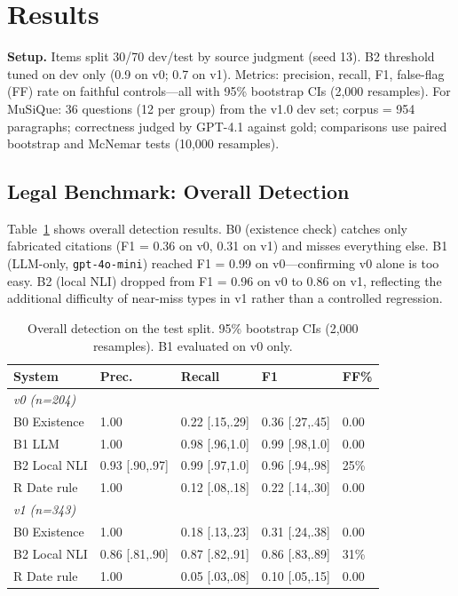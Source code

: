 \documentclass[conference]{IEEEtran}
\begin{document}
\section{Results}
\label{sec:experiments}

\textbf{Setup.} Items split 30/70 dev/test by source judgment (seed 13). B2 threshold tuned on
dev only (0.9 on v0; 0.7 on v1). Metrics: precision, recall, F1, false-flag (FF) rate on
faithful controls---all with 95\% bootstrap CIs (2,000 resamples). For MuSiQue: 36 questions
(12 per group) from the v1.0 dev set; corpus = 954 paragraphs; correctness judged by GPT-4.1
against gold; comparisons use paired bootstrap and McNemar tests (10,000 resamples).

\subsection{Legal Benchmark: Overall Detection}

Table~\ref{tab:overall} shows overall detection results. B0 (existence check) catches only
fabricated citations (F1 = 0.36 on v0, 0.31 on v1) and misses everything else. B1 (LLM-only,
\texttt{gpt-4o-mini}) reached F1 = 0.99 on v0---confirming v0 alone is too easy. B2 (local NLI)
dropped from F1 = 0.96 on v0 to 0.86 on v1, reflecting the additional difficulty of near-miss
types in v1 rather than a controlled regression.

\begin{table}[t]
\centering
\caption{Overall detection on the test split. 95\% bootstrap CIs (2,000 resamples).
         B1 evaluated on v0 only.}
\label{tab:overall}
\renewcommand{\arraystretch}{1.1}
\footnotesize
\begin{tabular}{@{}lllll@{}}
\toprule
\textbf{System} & \textbf{Prec.} & \textbf{Recall} & \textbf{F1} & \textbf{FF\%} \\
\midrule
\multicolumn{5}{l}{\textit{v0 (n=204)}} \\
B0 Existence  & 1.00 & 0.22 [.15,.29] & 0.36 [.27,.45] & 0.00 \\
B1 LLM        & 1.00 & 0.98 [.96,1.0] & 0.99 [.98,1.0] & 0.00 \\
B2 Local NLI  & 0.93 [.90,.97] & 0.99 [.97,1.0] & 0.96 [.94,.98] & 25\% \\
R  Date rule  & 1.00 & 0.12 [.08,.18] & 0.22 [.14,.30] & 0.00 \\
\midrule
\multicolumn{5}{l}{\textit{v1 (n=343)}} \\
B0 Existence  & 1.00 & 0.18 [.13,.23] & 0.31 [.24,.38] & 0.00 \\
B2 Local NLI  & 0.86 [.81,.90] & 0.87 [.82,.91] & 0.86 [.83,.89] & 31\% \\
R  Date rule  & 1.00 & 0.05 [.03,.08] & 0.10 [.05,.15] & 0.00 \\
\bottomrule
\end{tabular}
\end{table}
\end{document}
